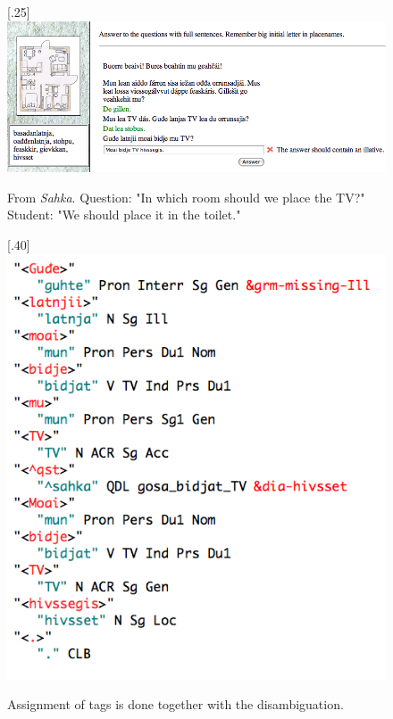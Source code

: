 \documentclass[11pt]{article}
\begin{document}
\begin{figure}[htbp]
\begin{center}
\scalebox{.25}[.25]{\includegraphics{presentation/img/TVhivssegis.png}}\\
\caption{From \textit{Sahka}. Question: "In which room should we place the TV?" Student: "We should place it in the toilet."
}
\label{sahka}
\end{center}
\end{figure}


\begin{figure}[htbp]
\begin{center}
\scalebox{.40}[.40]{\includegraphics{presentation/img/hivssegisCGanal.png}}\\
\caption{Assignment of tags is done together with the disambiguation.}
\label{hivssetanalysis}
\end{center}
\end{figure}
\end{document}
